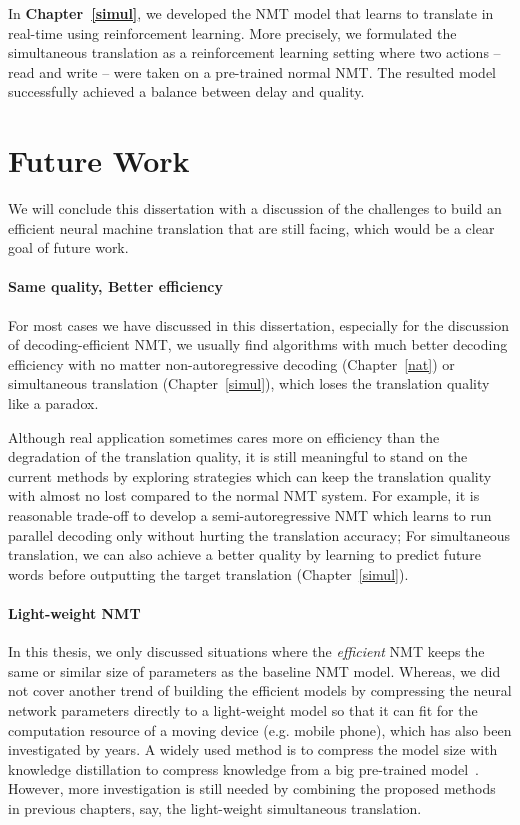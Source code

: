 In \textbf{Chapter~\ref{simul}}, we developed the NMT model that learns to translate in real-time using reinforcement learning. More precisely, we formulated the simultaneous translation as a reinforcement learning setting where two actions -- read and write -- were taken on a pre-trained normal NMT.  The resulted model successfully achieved a balance between delay and quality. 


\section{Future Work}
We will conclude this dissertation with a discussion of the challenges to build an efficient neural machine translation that are still facing, which would be a clear goal of future work. 
\paragraph{Same quality, Better efficiency }
For most cases we have discussed in this dissertation, especially for the discussion of decoding-efficient NMT, we usually find algorithms with much better decoding efficiency with no matter non-autoregressive decoding (Chapter~\ref{nat}) or simultaneous translation (Chapter~\ref{simul}), which loses the translation quality like a paradox. 

Although real application sometimes cares more on efficiency than the degradation of the translation quality, it is still meaningful to stand on the current methods by exploring strategies which can keep the translation quality with almost no lost compared to the normal NMT system.  For example, it is reasonable trade-off to develop a semi-autoregressive NMT which learns to run parallel decoding only without hurting the translation accuracy; For simultaneous translation, we can also achieve a better  quality by learning to predict future words before outputting the target translation (Chapter~\ref{simul}).


\paragraph{Light-weight NMT}
In this thesis, we only discussed situations where the {\it efficient} NMT keeps the same or similar size of parameters as the baseline NMT model. Whereas, we did not cover another trend of building the efficient models by compressing the neural network parameters directly to a light-weight model so that it can fit for the computation resource of a moving device (e.g. mobile phone), which has also been investigated by years. A widely used method is to compress the model size with knowledge distillation to compress knowledge from a big pre-trained model~\cite{kim2016sequence}.  However, more investigation is still needed by combining the proposed methods in previous chapters, say, the light-weight simultaneous translation.


